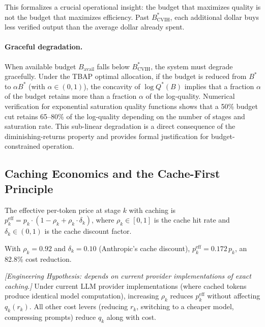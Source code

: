 This formalizes a crucial operational insight: the budget that maximizes quality is not the budget that maximizes efficiency. Past $B^*_{\text{CVIH}}$, each additional dollar buys less verified output than the average dollar already spent.

\paragraph{Graceful degradation.} When available budget $B_{\text{avail}}$ falls below $B^*_{\text{CVIH}}$, the system must degrade gracefully. Under the TBAP optimal allocation, if the budget is reduced from $B^*$ to $\alpha B^*$ (with $\alpha \in (0,1)$), the concavity of $\log Q^*(B)$ implies that a fraction $\alpha$ of the budget retains more than a fraction $\alpha$ of the log-quality. Numerical verification for exponential saturation quality functions shows that a 50\% budget cut retains 65--80\% of the log-quality depending on the number of stages and saturation rate. This sub-linear degradation is a direct consequence of the diminishing-returns property and provides formal justification for budget-constrained operation.

\subsection{Caching Economics and the Cache-First Principle}

\begin{definition}
\label{def:econ-cache-price}
The effective per-token price at stage $k$ with caching is $p_k^{\text{eff}} = p_k \cdot (1 - \rho_k + \rho_k \cdot \delta_k)$, where $\rho_k \in [0,1]$ is the cache hit rate and $\delta_k \in (0,1)$ is the cache discount factor.
\end{definition}

With $\rho_k = 0.92$ and $\delta_k = 0.10$ (Anthropic's cache discount), $p_k^{\text{eff}} = 0.172 \, p_k$, an 82.8\% cost reduction.

\begin{proposition}
\label{prop:econ-cache-first}
\emph{[Engineering Hypothesis: depends on current provider implementations of exact caching.]}
Under current LLM provider implementations (where cached tokens produce identical model computation), increasing $\rho_k$ reduces $p_k^{\text{eff}}$ without affecting $q_k(r_k)$. All other cost levers (reducing $r_k$, switching to a cheaper model, compressing prompts) reduce $q_k$ along with cost.
\end{proposition}

